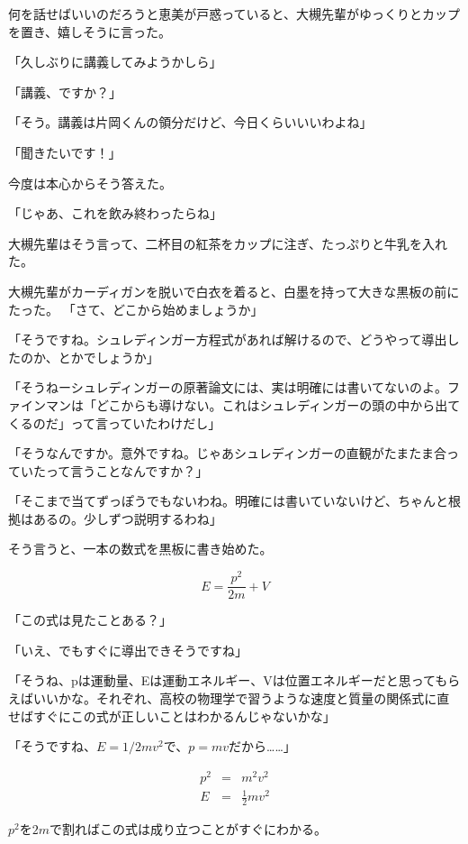 \documentclass[a4paper,dvipdfmx,12pt]{jsarticle}
\begin{document}
何を話せばいいのだろうと恵美が戸惑っていると、大槻先輩がゆっくりとカップを置き、嬉しそうに言った。

「久しぶりに講義してみようかしら」

「講義、ですか？」

「そう。講義は片岡くんの領分だけど、今日くらいいいわよね」

「聞きたいです！」

今度は本心からそう答えた。

「じゃあ、これを飲み終わったらね」

大槻先輩はそう言って、二杯目の紅茶をカップに注ぎ、たっぷりと牛乳を入れた。

\vspace{0.2in}

大槻先輩がカーディガンを脱いで白衣を着ると、白墨を持って大きな黒板の前にたった。
「さて、どこから始めましょうか」


「そうですね。シュレディンガー方程式があれば解けるので、どうやって導出したのか、とかでしょうか」

「そうねーシュレディンガーの原著論文には、実は明確には書いてないのよ。ファインマンは「どこからも導けない。これはシュレディンガーの頭の中から出てくるのだ」って言っていたわけだし」


「そうなんですか。意外ですね。じゃあシュレディンガーの直観がたまたま合っていたって言うことなんですか？」

「そこまで当てずっぽうでもないわね。明確には書いていないけど、ちゃんと根拠はあるの。少しずつ説明するわね」

そう言うと、一本の数式を黒板に書き始めた。

\begin{equation}
E=\frac{p^2}{2m}+V
\end{equation}


「この式は見たことある？」

「いえ、でもすぐに導出できそうですね」

「そうね、pは運動量、Eは運動エネルギー、Vは位置エネルギーだと思ってもらえばいいかな。それぞれ、高校の物理学で習うような速度と質量の関係式に直せばすぐにこの式が正しいことはわかるんじゃないかな」

「そうですね、$E=1/2mv^2$で、$p=mv$だから……」


\begin{eqnarray}
p^2&=&m^2v^2 \\
E&=&\frac{1}{2} mv^2
\end{eqnarray}

$p^2$を$2m$で割ればこの式は成り立つことがすぐにわかる。
\end{document}

